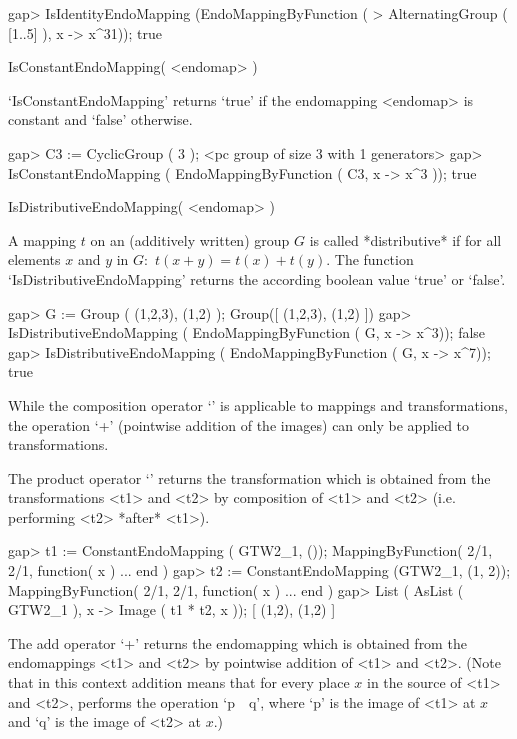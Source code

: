 \beginexample
    gap> IsIdentityEndoMapping (EndoMappingByFunction ( 
    > AlternatingGroup ( [1..5] ), x -> x^31));
    true
\endexample

\>IsConstantEndoMapping( <endomap> )

`IsConstantEndoMapping' returns `true' if the endomapping
<endomap> is constant and `false' otherwise.

\beginexample
    gap> C3 := CyclicGroup ( 3 );
    <pc group of size 3 with 1 generators>
    gap> IsConstantEndoMapping ( EndoMappingByFunction ( C3,  x -> x^3 ));
    true
\endexample

\>IsDistributiveEndoMapping( <endomap> )

A mapping $t$ on an (additively written) group $G$ is called
*distributive* if for all elements $x$ and $y$ in $G$:\
$t(x+y) = t(x) + t(y)$.
The function `IsDistributiveEndoMapping' returns the according
boolean value `true' or `false'.

\beginexample
    gap> G := Group ( (1,2,3), (1,2) );
    Group([ (1,2,3), (1,2) ])
    gap> IsDistributiveEndoMapping ( EndoMappingByFunction ( G, x -> x^3));
    false
    gap> IsDistributiveEndoMapping ( EndoMappingByFunction ( G, x -> x^7));
    true
\endexample

\Section{Operations for endo mappings}


While the composition operator `\*' is applicable to mappings and
transformations, the operation `+' (pointwise addition of the images) can
only be applied to transformations.

The product operator `\*' returns the transformation which is obtained 
from the transformations <t1> and <t2> by composition of <t1> and <t2>
(i.e. performing <t2> *after* <t1>).

\beginexample
    gap> t1 := ConstantEndoMapping ( GTW2_1, ());
    MappingByFunction( 2/1, 2/1, function( x ) ... end )
    gap> t2 := ConstantEndoMapping (GTW2_1, (1, 2));
    MappingByFunction( 2/1, 2/1, function( x ) ... end )
    gap> List ( AsList ( GTW2_1 ), x -> Image ( t1 * t2, x ));
    [ (1,2), (1,2) ]
\endexample

The add operator `+' returns the endomapping which is obtained 
from the endomappings <t1> and <t2> by pointwise addition 
of <t1> and <t2>. (Note that in this context addition means that
for every place $x$ in the source of <t1> and <t2>,   
{\GAP} performs the  operation `p\ \*\ q', where
`p' is the image of <t1> at $x$ and `q' is the image of <t2> at $x$.) 

